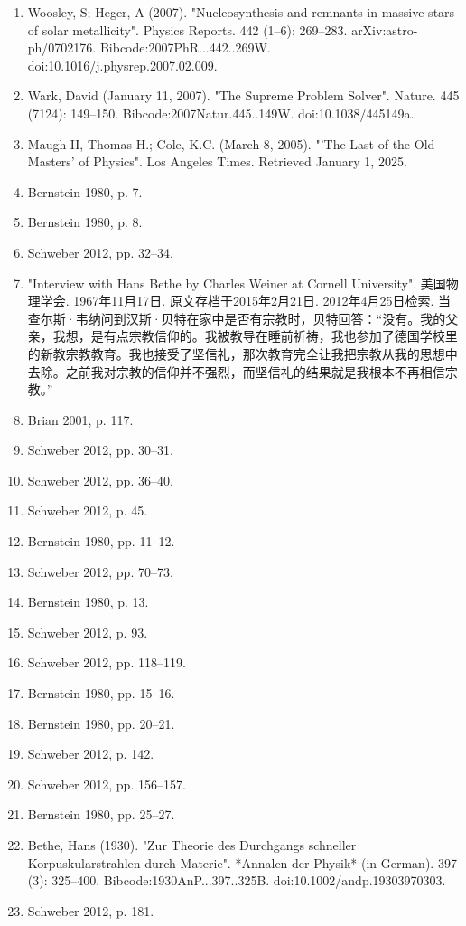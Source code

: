 \begin{enumerate}
\item Woosley, S; Heger, A (2007). "Nucleosynthesis and remnants in massive stars of solar metallicity". Physics Reports. 442 (1–6): 269–283. arXiv:astro-ph/0702176. Bibcode:2007PhR...442..269W. doi:10.1016/j.physrep.2007.02.009.
\item Wark, David (January 11, 2007). "The Supreme Problem Solver". Nature. 445 (7124): 149–150. Bibcode:2007Natur.445..149W. doi:10.1038/445149a.
\item Maugh II, Thomas H.; Cole, K.C. (March 8, 2005). "'The Last of the Old Masters' of Physics". Los Angeles Times. Retrieved January 1, 2025.
\item Bernstein 1980, p. 7.  
\item Bernstein 1980, p. 8.  
\item Schweber 2012, pp. 32–34.  
\item "Interview with Hans Bethe by Charles Weiner at Cornell University". 美国物理学会. 1967年11月17日. 原文存档于2015年2月21日. 2012年4月25日检索. 当查尔斯·韦纳问到汉斯·贝特在家中是否有宗教时，贝特回答：“没有。我的父亲，我想，是有点宗教信仰的。我被教导在睡前祈祷，我也参加了德国学校里的新教宗教教育。我也接受了坚信礼，那次教育完全让我把宗教从我的思想中去除。之前我对宗教的信仰并不强烈，而坚信礼的结果就是我根本不再相信宗教。”
\item Brian 2001, p. 117.  
\item Schweber 2012, pp. 30–31.  
\item Schweber 2012, pp. 36–40.  
\item Schweber 2012, p. 45.  
\item Bernstein 1980, pp. 11–12.  
\item Schweber 2012, pp. 70–73.  
\item Bernstein 1980, p. 13.  
\item Schweber 2012, p. 93.  
\item Schweber 2012, pp. 118–119.  
\item Bernstein 1980, pp. 15–16.  
\item Bernstein 1980, pp. 20–21.  
\item Schweber 2012, p. 142.  
\item Schweber 2012, pp. 156–157.  
\item Bernstein 1980, pp. 25–27.
\item Bethe, Hans (1930). "Zur Theorie des Durchgangs schneller Korpuskularstrahlen durch Materie". *Annalen der Physik* (in German). 397 (3): 325–400. Bibcode:1930AnP...397..325B. doi:10.1002/andp.19303970303.  
\item Schweber 2012, p. 181.  

\end{enumerate}
